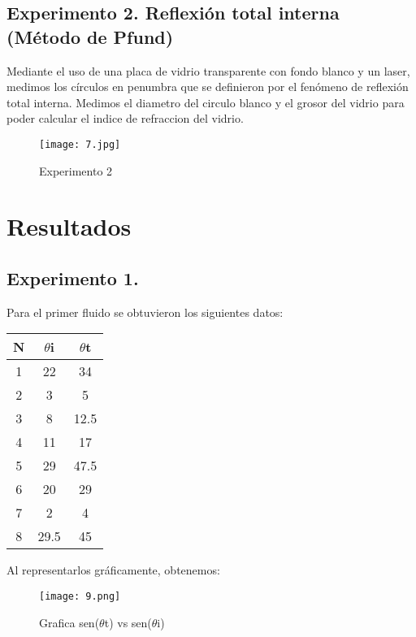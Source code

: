 \documentclass[10pt,journal]{IEEEtran}
\begin{document}
\subsection{Experimento 2. Reflexión total interna (Método de Pfund)}
Mediante el uso de una placa de vidrio transparente con fondo blanco y un laser, medimos los círculos en penumbra que se definieron por el fenómeno de reflexión total interna. Medimos el diametro del circulo blanco y el grosor del vidrio para poder calcular el indice de refraccion del vidrio.

\begin{figure}[!ht]
\begin {center}
\texttt{[image: 7.jpg]}
\caption{Experimento 2}
\end {center}
\end{figure}


\section{Resultados}


\subsection{Experimento 1.}


Para el primer fluido se obtuvieron los siguientes datos:
\begin{center}
\begin{tabular}{|c|c|c|}
\hline
N & $\theta$i & $\theta$t \\
\hline
1 & 22 & 34\\
\hline
2 & 3 & 5\\
\hline
3 & 8 & 12.5\\
\hline
4 & 11 & 17\\
\hline
5 & 29 & 47.5\\
\hline
6 & 20 & 29\\
\hline
7 & 2 & 4\\
\hline
8 & 29.5 & 45\\
\hline
\end{tabular}
\end{center}

Al representarlos gráficamente, obtenemos:


\begin{figure}[!ht]
\begin {center}
\texttt{[image: 9.png]}
\caption{Grafica sen($\theta$t) vs sen($\theta$i)}
\end {center}
\end{figure}
\end{document}
